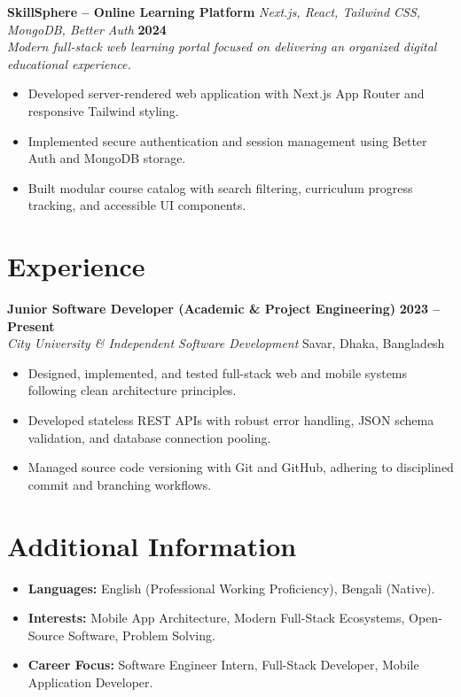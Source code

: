 \documentclass[10pt,a4paper]{article}
\begin{document}
\vspace{2pt}
\textbf{SkillSphere – Online Learning Platform} \textbar{} \textit{Next.js, React, Tailwind CSS, MongoDB, Better Auth} \hfill \textbf{2024} \\
\textit{Modern full-stack web learning portal focused on delivering an organized digital educational experience.}
\begin{itemize}
    \item Developed server-rendered web application with Next.js App Router and responsive Tailwind styling.
    \item Implemented secure authentication and session management using Better Auth and MongoDB storage.
    \item Built modular course catalog with search filtering, curriculum progress tracking, and accessible UI components.
\end{itemize}

\section{Experience}
\textbf{Junior Software Developer (Academic \& Project Engineering)} \hfill \textbf{2023 -- Present} \\
\textit{City University \& Independent Software Development} \hfill Savar, Dhaka, Bangladesh
\begin{itemize}
    \item Designed, implemented, and tested full-stack web and mobile systems following clean architecture principles.
    \item Developed stateless REST APIs with robust error handling, JSON schema validation, and database connection pooling.
    \item Managed source code versioning with Git and GitHub, adhering to disciplined commit and branching workflows.
\end{itemize}

\section{Additional Information}
\begin{itemize}
    \item \textbf{Languages:} English (Professional Working Proficiency), Bengali (Native).
    \item \textbf{Interests:} Mobile App Architecture, Modern Full-Stack Ecosystems, Open-Source Software, Problem Solving.
    \item \textbf{Career Focus:} Software Engineer Intern, Full-Stack Developer, Mobile Application Developer.
\end{itemize}
\end{document}
